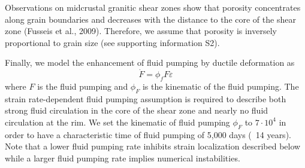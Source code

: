 Observations on midcrustal granitic shear zones show that porosity concentrates
along grain boundaries and decreases with the distance to the core of the shear zone (Fusseis et al., 2009).
Therefore, we assume that porosity is inversely proportional to grain size (see supporting information S2).

Finally, we model the enhancement of fluid pumping by ductile deformation as
\[
\dot{F} = \phi_f F \dot{\varepsilon}
\]
where $F$ is the fluid pumping and $\phi_F$ is the kinematic of the fluid pumping. 
The strain rate-dependent fluid pumping assumption is required to describe both strong 
fluid circulation in the core of the shear zone and nearly no fluid circulation at 
the rim. We set the kinematic of fluid pumping $\phi_F$ to $7\cdot10^4$ in order to have a 
characteristic time of fluid pumping of 5,000 days (~14 years). 
Note that a lower fluid pumping rate inhibits strain
localization described below while a larger fluid pumping rate implies numerical instabilities.


